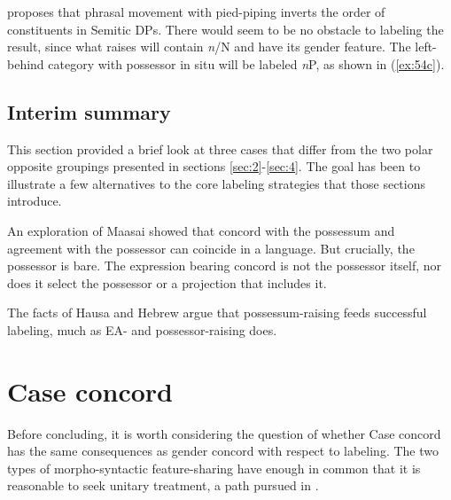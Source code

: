 \documentclass[output=paper
,modfonts
,nonflat]{langsci/langscibook}
\begin{document}
\citet{Shlonsky2004} proposes that phrasal movement with pied-piping inverts the order of constituents in Semitic DPs. There would seem to be no obstacle to labeling the result, since what raises will contain \textit{n}/N and have its gender feature. The left-behind category with possessor in situ will be labeled \textit{n}P, as shown in (\ref{ex:54c}).

\subsection{Interim summary} \label{sec:6.6}
This section provided a brief look at three cases that differ from the two polar opposite groupings presented in sections \ref{sec:2}-\ref{sec:4}. The goal has been to illustrate a few alternatives to the core labeling strategies that those sections introduce. 

An exploration of Maasai showed that concord with the possessum and agreement with the possessor can coincide in a language. But crucially, the possessor is bare. The expression bearing concord is not the possessor itself, nor does it select the possessor or a projection that includes it.  

The facts of Hausa and Hebrew argue that possessum-raising feeds successful labeling, much as EA- and possessor-raising does.

\section{Case concord} \label{sec:7}
Before concluding, it is worth considering the question of whether Case concord has the same consequences as gender concord with respect to labeling. The two types of morpho-syntactic feature-sharing have enough in common that it is reasonable to seek unitary treatment, a path pursued in \citealt{Norris2014}. 
\end{document}
